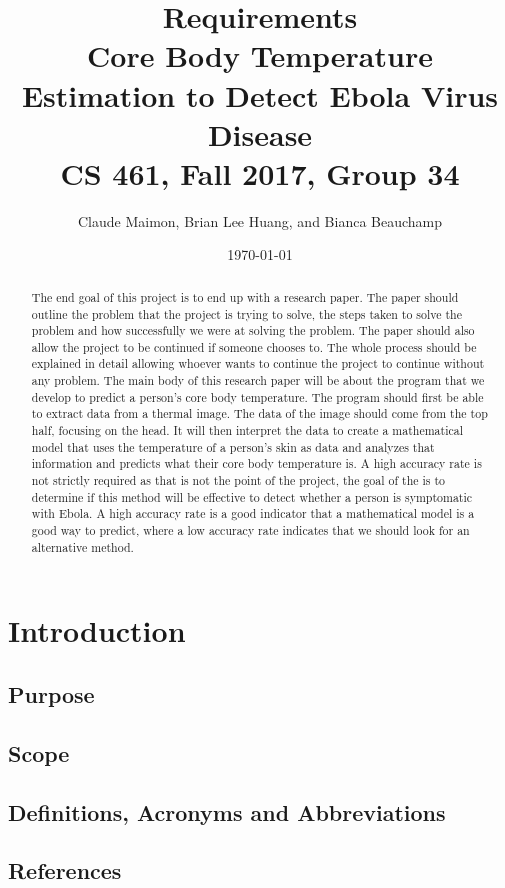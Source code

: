 \documentclass[10pt, draftclsnofoot, onecolumn]{IEEEtran}
\title{%
  Requirements \\
  \vspace{0.4cm}
  \large Core Body Temperature Estimation to Detect Ebola Virus Disease \\
  \vspace{0.4cm}
  \large CS 461, Fall 2017, Group 34\\
    }
\author{Claude Maimon, Brian Lee Huang, and Bianca Beauchamp}
\date{\today}
\begin{document}
\maketitle

\begin{abstract}
	The end goal of this project is to end up with a research paper. The paper should outline the problem that the project is trying to solve, the steps taken to solve the problem and how successfully we were
	at solving the problem. The paper should also allow the project to be continued if someone chooses to. The whole process should be explained in detail allowing whoever wants to continue the
	project to continue without any problem. The main body of this research paper will be about the program that we develop to predict a person's core body temperature. The program should first be able to
	extract data from a thermal image. The data of the image should come from the top half, focusing on the head. It will then interpret the data to create a mathematical model that uses the temperature of a 
	person's skin as data and analyzes that information and predicts what their core body temperature is. A high accuracy rate is not strictly required as that is not the point of the project, 
	the goal of the is to determine if this method will be effective to detect whether a person is symptomatic with Ebola. A high accuracy rate is a good indicator that a mathematical model
	is a good way to predict, where a low accuracy rate indicates that we should look for an alternative method.
\end{abstract}

\newpage
\section{Introduction}
	\subsection{Purpose}
	\subsection{Scope}
	\subsection{Definitions, Acronyms and Abbreviations}
	\subsection{References}
\end{document}
